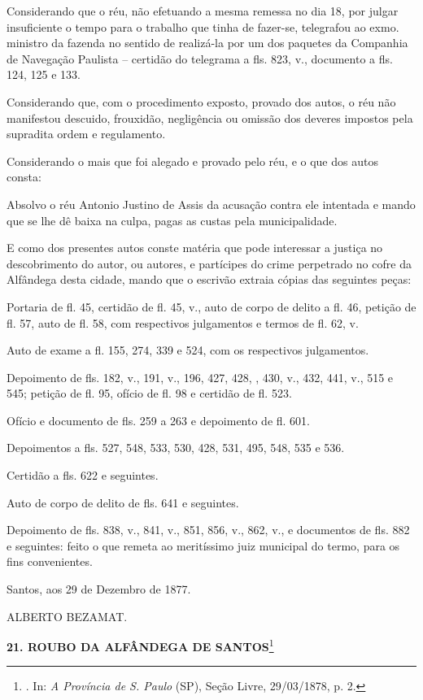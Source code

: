 Considerando que o réu, não efetuando a mesma remessa no dia 18, por
julgar insuficiente o tempo para o trabalho que tinha de fazer-se,
telegrafou ao exmo. ministro da fazenda no sentido de realizá-la por um
dos paquetes da Companhia de Navegação Paulista -- certidão do telegrama
a fls. 823, v., documento a fls. 124, 125 e 133.

Considerando que, com o procedimento exposto, provado dos autos, o réu
não manifestou descuido, frouxidão, negligência ou omissão dos deveres
impostos pela supradita ordem e regulamento.

Considerando o mais que foi alegado e provado pelo réu, e o que dos
autos consta:

Absolvo o réu Antonio Justino de Assis da acusação contra ele intentada
e mando que se lhe dê baixa na culpa, pagas as custas pela
municipalidade.

E como dos presentes autos conste matéria que pode interessar a justiça
no descobrimento do autor, ou autores, e partícipes do crime perpetrado
no cofre da Alfândega desta cidade, mando que o escrivão extraia cópias
das seguintes peças:

Portaria de fl. 45, certidão de fl. 45, v., auto de corpo de delito a
fl. 46, petição de fl. 57, auto de fl. 58, com respectivos julgamentos e
termos de fl. 62, v.

Auto de exame a fl. 155, 274, 339 e 524, com os respectivos julgamentos.

Depoimento de fls. 182, v., 191, v., 196, 427, 428, , 430, v., 432, 441,
v., 515 e 545; petição de fl. 95, ofício de fl. 98 e certidão de fl.
523.

Ofício e documento de fls. 259 a 263 e depoimento de fl. 601.

Depoimentos a fls. 527, 548, 533, 530, 428, 531, 495, 548, 535 e 536.

Certidão a fls. 622 e seguintes.

Auto de corpo de delito de fls. 641 e seguintes.

Depoimento de fls. 838, v., 841, v., 851, 856, v., 862, v., e documentos
de fls. 882 e seguintes: feito o que remeta ao meritíssimo juiz
municipal do termo, para os fins convenientes.

Santos, aos 29 de Dezembro de 1877.

ALBERTO BEZAMAT.

\textbf{21. ROUBO DA ALFÂNDEGA DE SANTOS}\footnote{. In: \emph{A
  Província de S. Paulo} (SP), Seção Livre, 29/03/1878, p. 2.}

